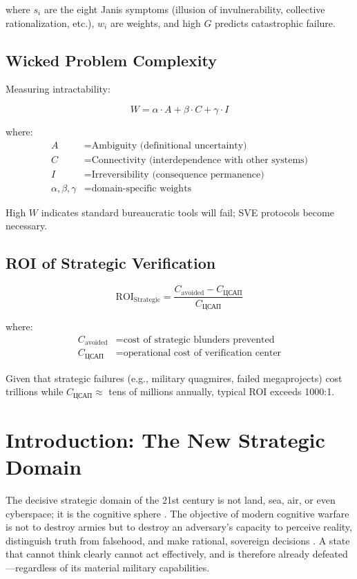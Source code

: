 \documentclass[11pt,a4paper]{article}
\begin{document}
\begin{small}
where $s_i$ are the eight Janis symptoms (illusion of invulnerability, collective rationalization, etc.), $w_i$ are weights, and high $G$ predicts catastrophic failure.

\subsection*{Wicked Problem Complexity}
Measuring intractability:

\begin{equation}
W = \alpha \cdot A + \beta \cdot C + \gamma \cdot I
\label{eq:wicked}
\end{equation}

where:
\begin{align*}
A &= \text{Ambiguity (definitional uncertainty)} \\
C &= \text{Connectivity (interdependence with other systems)} \\
I &= \text{Irreversibility (consequence permanence)} \\
\alpha, \beta, \gamma &= \text{domain-specific weights}
\end{align*}

\noindent High $W$ indicates standard bureaucratic tools will fail; SVE protocols become necessary.

\subsection*{ROI of Strategic Verification}
\begin{equation}
\text{ROI}_{\text{Strategic}} = \frac{C_{\text{avoided}} - C_{\text{ЦСАП}}}{C_{\text{ЦСАП}}}
\label{eq:roi_strategic}
\end{equation}

where:
\begin{align*}
C_{\text{avoided}} &= \text{cost of strategic blunders prevented} \\
C_{\text{ЦСАП}} &= \text{operational cost of verification center}
\end{align*}

\noindent Given that strategic failures (e.g., military quagmires, failed megaprojects) cost trillions while $C_{\text{ЦСАП}} \approx$ tens of millions annually, typical ROI exceeds 1000:1.

\vspace{0.5cm}
\clearpage
\setcounter{page}{1}

\section{Introduction: The New Strategic Domain}
The decisive strategic domain of the 21st century is not land, sea, air, or even cyberspace; it is the cognitive sphere \citep[lines 624--625, 1350--1351]{AnalyticalReport2025}. The objective of modern cognitive warfare is not to destroy armies but to destroy an adversary's capacity to perceive reality, distinguish truth from falsehood, and make rational, sovereign decisions \citep[lines 624--625]{AnalyticalReport2025}. A state that cannot think clearly cannot act effectively, and is therefore already defeated—regardless of its material military capabilities.


\end{small}
\end{document}
